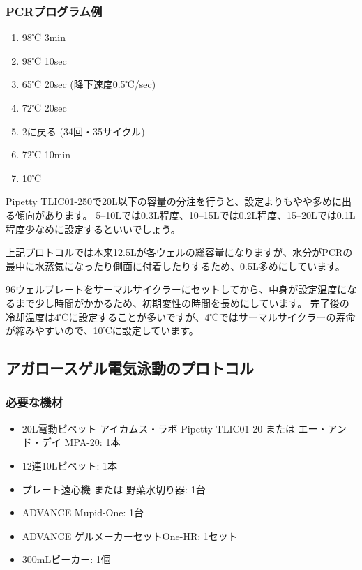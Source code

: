 \documentclass[titlepage,10pt,a4paper]{jsbook}
\begin{document}
\subsubsection{PCRプログラム例}
\begin{enumerate}
\item 98℃ 3min
\item 98℃ 10sec
\item 65℃ 20sec (降下速度0.5℃/sec)
\item 72℃ 20sec
\item 2に戻る (34回・35サイクル)
\item 72℃ 10min
\item 10℃
\end{enumerate}

Pipetty TLIC01-250で20{\textmu}L以下の容量の分注を行うと、設定よりもやや多めに出る傾向があります。
5--10{\textmu}Lでは0.3{\textmu}L程度、10--15{\textmu}Lでは0.2{\textmu}L程度、15--20{\textmu}Lでは0.1{\textmu}L程度少なめに設定するといいでしょう。

上記プロトコルでは本来12.5{\textmu}Lが各ウェルの総容量になりますが、水分がPCRの最中に水蒸気になったり側面に付着したりするため、0.5{\textmu}L多めにしています。

96ウェルプレートをサーマルサイクラーにセットしてから、中身が設定温度になるまで少し時間がかかるため、初期変性の時間を長めにしています。
完了後の冷却温度は4℃に設定することが多いですが、4℃ではサーマルサイクラーの寿命が縮みやすいので、10℃に設定しています。

\subsection{アガロースゲル電気泳動のプロトコル}

\subsubsection{必要な機材}
\begin{itemize}
\item 20{\textmu}L電動ピペット アイカムス・ラボ Pipetty TLIC01-20 または エー・アンド・デイ MPA-20: 1本
\item 12連10{\textmu}Lピペット: 1本
\item プレート遠心機 または 野菜水切り器: 1台
\item ADVANCE Mupid-One: 1台
\item ADVANCE ゲルメーカーセットOne-HR: 1セット
\item 300mLビーカー: 1個
\end{itemize}
\end{document}
